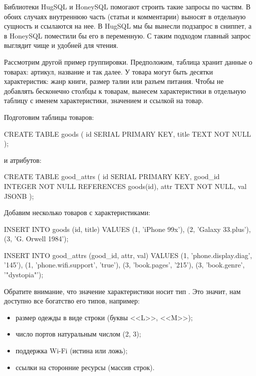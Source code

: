 Библиотеки HugSQL и HoneySQL помогают строить такие запросы по частям. В обоих случаях внутреннюю часть (статьи и комментарии) выносят в отдельную сущность и ссылаются на нее. В HugSQL мы бы вынесли подзапрос в сниппет, а в HoneySQL поместили бы его в переменную. С таким подходом главный запрос выглядит чище и удобней для чтения.

Рассмотрим другой пример группировки. Предположим, таблица хранит данные о товарах: артикул, название и так далее. У товара могут быть десятки характеристик: жанр книги, размер талии или разъем питания. Чтобы не добавлять бесконечно столбцы к товарам, вынесем характеристики в отдельную таблицу с именем характеристики, значением и ссылкой на товар.

Подготовим таблицы товаров:

\begin{english}
  \begin{sql}
CREATE TABLE goods (
  id SERIAL PRIMARY KEY,
  title TEXT NOT NULL
);
  \end{sql}
\end{english}

\noindent
и атрибутов:

\begin{english}
  \begin{sql}
CREATE TABLE good_attrs (
  id SERIAL PRIMARY KEY,
  good_id INTEGER NOT NULL REFERENCES goods(id),
  attr TEXT NOT NULL,
  val JSONB
);
  \end{sql}
\end{english}

Добавим несколько товаров с характеристиками:

\begin{english}
  \begin{sql}
INSERT INTO goods (id, title)
VALUES
  (1, 'iPhone 99x'),
  (2, 'Galaxy 33.plus'),
  (3, 'G. Orwell 1984');

INSERT INTO good_attrs (good_id, attr, val)
VALUES
  (1, 'phone.display.diag', '145'),
  (1, 'phone.wifi.support', 'true'),
  (3, 'book.pages', '215'),
  (3, 'book.genre', '"dystopia"');
  \end{sql}
\end{english}

Обратите внимание, что значение характеристики носит тип . Это значит, нам доступно все богатство его типов, например:

\begin{itemize}

\item
  размер одежды в виде строки (буквы <<L>>, <<M>>);

\item
  число портов натуральным числом (2, 3);

\item
  поддержка Wi-Fi (истина или ложь);

\item
  ссылки на сторонние ресурсы (массив строк).

\end{itemize}

